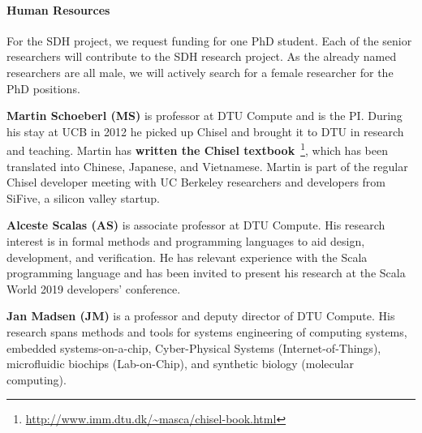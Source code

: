 \documentclass[fleqn,12pt]{article}
\begin{document}
\paragraph*{Human Resources}

For the SDH project, we request funding for one PhD student.
Each of the senior researchers will contribute to the SDH research project.
%
%
As the already named researchers are all male, we will actively search
for a female researcher for the PhD positions.


{\bf Martin Schoeberl (MS)} is professor at DTU Compute and is the PI.
During his stay
at UCB in 2012 he picked up Chisel and brought it to DTU in research and teaching.
Martin has {\bf written the Chisel textbook}~\cite{chisel:book}\footnote{\url{http://www.imm.dtu.dk/~masca/chisel-book.html}}, which has been translated
into Chinese, Japanese, and Vietnamese.
Martin is part of the regular Chisel developer meeting with
UC Berkeley researchers and developers from SiFive, a silicon valley startup.


{\bf Alceste Scalas (AS)} is associate professor at DTU Compute. His research interest is in formal methods and programming languages to aid design, development, and verification. He has relevant experience with the Scala programming language and has been invited to present his research at the Scala World 2019 developers' conference.

{\bf Jan Madsen (JM)} is a professor and deputy director of DTU Compute.
His research spans methods
and tools for systems engineering of computing systems, embedded systems-on-a-chip,
Cyber-Physical Systems (Internet-of-Things), microfluidic biochips (Lab-on-Chip), and
synthetic biology (molecular computing).
\end{document}

